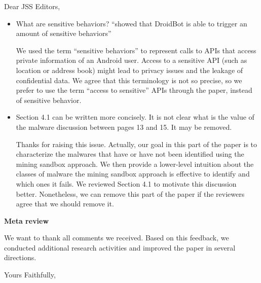 \documentclass[12pt,english]{scrartcl}
\begin{document}
\begin{letter}{Dear JSS Editors,}
\begin{itemize}
\vspace{0.2cm}

\item What are sensitive behaviors? ``showed that DroidBot is able to trigger an amount of sensitive behaviors''

\vspace{0.2cm}

{\color{blue}{\bf Answer.} We used the term ``sensitive behaviors'' to represent calls to APIs that access private information of an Android user. Access to a sensitive API (such as location or address book) might lead to privacy issues and the leakage of confidential data. We agree that this terminology is not so precise, so we prefer to use the term ``access to sensitive'' APIs through the paper, instead of sensitive behavior.}

\vspace{0.2cm}

\item Section 4.1 can be written more concisely. It is not clear what is the value of the malware
  discussion between pages 13 and 15. It may be removed.

\vspace{0.2cm}

{\color{blue}{\bf Answer.}Thanks for raising this issue. Actually, our goal in this part of the paper is to characterize the malwares that have or have not been identified using the mining sandbox approach. We then provide a lower-level intuition about the classes of malware the mining sandbox approach is effective to identify and which ones it fails. We reviewed Section 4.1 to motivate this discussion better. Nonetheless, we can remove this part of the paper if the reviewers agree that we should remove it.}


\end{itemize}



{\bf Meta review}

We want to thank all comments we received. Based on this feedback, we conducted additional research activities and improved the paper in several directions.

\closing{Yours Faithfully,}





\end{letter}
\end{document}
